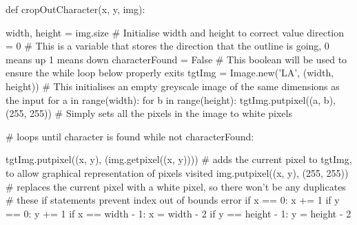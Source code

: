 \documentclass{report}
\begin{document}
\begin{python}
def cropOutCharacter(x, y, img):

    width, height = img.size  # Initialise width and height to correct value
    direction = 0  # This is a variable that stores the direction that the outline is going, 0 means up 1 means down
    characterFound = False  # This boolean will be used to ensure the while loop below properly exits
    tgtImg = Image.new('LA', (width, height))  # This initialises an empty greyscale image of the same dimensions as the input
    for a in range(width):
        for b in range(height):
            tgtImg.putpixel((a, b), (255, 255))  # Simply sets all the pixels in the image to white pixels

    # loops until character is found
    while not characterFound:

        tgtImg.putpixel((x, y), (img.getpixel((x, y))))  # adds the current pixel to tgtImg, to allow graphical representation of pixels visited
        img.putpixel((x, y), (255, 255))  # replaces the current pixel with a white pixel, so there won't be any duplicates
        #  these if statements prevent index out of bounds error
        if x == 0:
            x += 1
        if y == 0:
            y += 1
        if x == width - 1:
            x = width - 2
        if y == height - 1:
            y = height - 2


\end{python}
\end{document}
